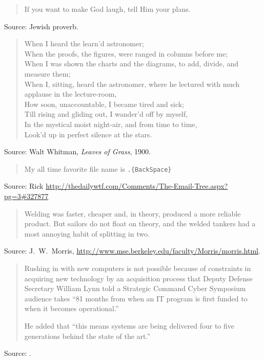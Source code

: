 \documentclass[a4paper]{article}
\begin{document}
\begin{quote}
	If you want to make God laugh, tell Him your plans.
\end{quote}
Source: Jewish proverb.
\medskip

\begin{verse}
		\begin{centering}
			When I heard the learn'd astronomer; \\
			When the proofs, the figures, were ranged in columns before me; \\
			When I was shown the charts and the diagrams, to add, divide,
				and measure them; \\
			When I, sitting, heard the astronomer, where he lectured
				with much applause in the lecture-room, \\
			How soon, unaccountable, I became tired and sick; \\
			Till rising and gliding out, I wander'd off by myself, \\
			In the mystical moist night-air, and from time to time, \\
			Look'd up in perfect silence at the stars. \\
		\end{centering}
\end{verse}
Source: Walt Whitman, \emph{Leaves of Grass}, 1900.
\medskip

\begin{quote}
	My all time favorite file name is \verb,.{BackSpace},
\end{quote}
Source: Rick \url{http://thedailywtf.com/Comments/The-Email-Tree.aspx?pg=3#327877}
\medskip

\begin{quote}
	Welding was faster, cheaper and, in theory, produced a more
	reliable product. But sailors do not float on theory, and the
	welded tankers had a most annoying habit of splitting in two.
\end{quote}
Source: J.~W.~Morris, \url{http://www.mse.berkeley.edu/faculty/Morris/morris.html}.
\medskip

\begin{quote}
	Rushing in with new computers is not possible because of constraints
	in acquiring new technology by an acquisition process that Deputy
	Defense Secretary William Lynn told a Strategic Command Cyber Symposium
	audience takes ``81 months from when an IT program is first funded to
	when it becomes operational.''

	He added that ``this means systems are being delivered four to five
	generations behind the state of the art.''
\end{quote}
Source: \citet{Hodges2010}.
\medskip
\end{document}
